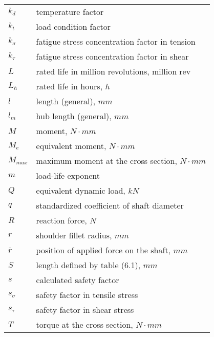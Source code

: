 \begin{tabular}[t]{lp{6.5cm}}
	$ k_d $ & temperature factor\\
	$ k_t $ & load condition factor\\
	$ k_\sigma $ & fatigue stress concentration factor in tension\\
	$ k_\tau $ & fatigue stress concentration factor in shear\\
	$ L $ & rated life in million revolutions, $ \unit{\text{million rev}} $\\
	$ L_h $ & rated life in hours, $ \unit{h} $\\
	$ l $ & length (general), $ \unit{mm} $\\
	$ l_m $ & hub length (general), $ \unit{mm} $\\
	$ M $ & moment, $ \unit{N\cdot mm} $\\
	$ M_e $ & equivalent moment, $ \unit{N\cdot mm} $\\
	$ M_{max} $ & maximum moment at the cross section, $ \unit{N\cdot mm} $\\
	$ m $ & load-life exponent\\
	$ Q $ & equivalent dynamic load, $ \unit{kN} $\\
	$ q $ & standardized coefficient of shaft diameter\\
	$ R $ & reaction force, $ \unit{N} $\\
	$ r $ & shoulder fillet radius, $ \unit{mm} $\\
	$ \bar{r} $ & position of applied force on the shaft, $\unit{mm}$\\
	$ S $ & length defined by table (6.1), $ \unit{mm} $\\
	$ s $ & calculated safety factor\\
	$ s_\sigma $ & safety factor in tensile stress\\
	$ s_\tau $ & safety factor in shear stress\\
	$ T $ & torque at the cross section, $ \unit{N\cdot mm} $\\
\end{tabular}
